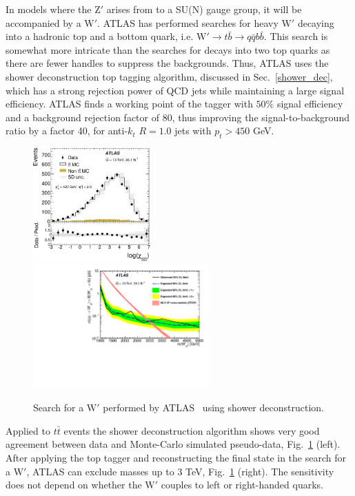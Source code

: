 In models where the $\text{Z}'$ arises from to a SU(N) gauge group, it will be accompanied by a $\text{W}'$. ATLAS \cite{Aaboud:2018juj} has performed searches for heavy $\text{W}'$ decaying into a hadronic top and a bottom quark, i.e. $\text{W}' \to t  \bar{b} \to q \bar{q} b \bar{b}$. This search is somewhat more intricate than the searches for decays into two top quarks as there are fewer handles to suppress the backgrounds. Thus, ATLAS uses the shower deconstruction top tagging algorithm, discussed in Sec.~\ref{shower_dec}, which has a strong rejection power of QCD jets while maintaining a large signal efficiency. ATLAS finds a working point of the tagger with $50\%$ signal efficiency and a background rejection factor of 80, thus improving the signal-to-background ratio by a factor 40, for anti-$k_t$ $R=1.0$ jets with $p_t>450$ GeV. 
%
\begin{figure}
  \includegraphics[width=0.4\textwidth]{figures/ATLAS_Wprime_data.pdf} 
  \includegraphics[width=0.6\textwidth]{figures/ATLAS_WR_exclusion.pdf}
  \caption{Search for a $\text{W}'$ performed by ATLAS~\cite{Aaboud:2018juj} using shower deconstruction.}\label{fig:Wprime_excl}
\end{figure}
%
Applied to $t\bar{t}$ events the shower deconstruction algorithm shows very good agreement between data and Monte-Carlo simulated pseudo-data, Fig.~\ref{fig:Wprime_excl} (left). After applying the top tagger and reconstructing the final state in the search for a $\text{W}'$, ATLAS can exclude masses up to 3 TeV, Fig.~\ref{fig:Wprime_excl} (right). The sensitivity does not depend on whether the $\text{W}'$ couples to left or right-handed quarks.



